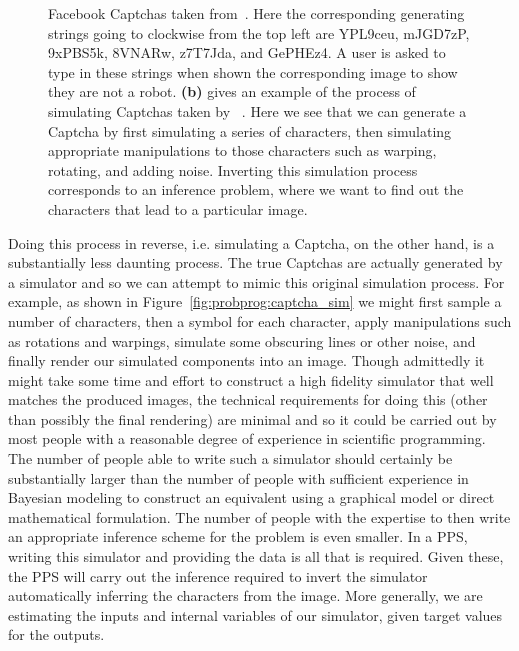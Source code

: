 \begin{figure}[t]
{		Facebook Captchas taken from~\cite{le2017using}.  Here the corresponding
		generating strings going
		to clockwise from the top left are YPL9ceu, mJGD7zP, 9xPBS5k, 8VNARw, z7T7Jda, and
		GePHEz4.  A user is asked to type in these strings when shown the corresponding
		image to show they are not a robot.
		\textbf{(b)} gives an example of the process of simulating Captchas taken by
		~\cite{le2017inference}.  Here we see that we can generate a Captcha by first
		simulating a series of characters, then simulating appropriate manipulations 
		to those characters such as warping, rotating, and adding noise.  Inverting this
		simulation process corresponds to an inference problem, where we want to find
		out the characters that lead to a particular image.
		\label{fig:probprog:captcha}}
\end{figure}

Doing this process in reverse, i.e. simulating a Captcha, on the other hand, is a substantially
less daunting process.  The true Captchas are actually generated by
a simulator and so we can attempt to mimic this original simulation process.
For example, as shown in Figure~\ref{fig:probprog:captcha_sim} we might first sample a 
number of characters, then a symbol for each character, apply manipulations such as rotations and warpings, simulate
some obscuring lines or other noise, and finally render our simulated components into an
image.  Though admittedly it might take some time and effort to construct a high fidelity
simulator that well matches the produced images, the technical requirements for doing this
(other than possibly the final rendering) are minimal and so it could be carried out by most
people with a reasonable degree of experience in scientific programming.  The number of
people able to write such a simulator should certainly be substantially larger than the
number of people with sufficient experience in Bayesian modeling to construct an equivalent
using a graphical model or direct mathematical formulation.  The number of people
with the expertise to then write an appropriate inference scheme for the problem is even
smaller.  In a PPS, writing this simulator and providing the data is all that is required.
Given these, the PPS will carry out the inference required to invert the simulator automatically
inferring the characters from the image.  More generally, we are estimating the inputs and
internal variables of our simulator, given target values for the outputs.

